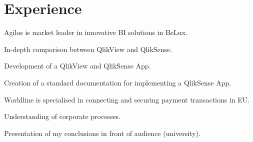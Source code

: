 \documentclass[letterpaper]{my-resume} %
\begin{document}
\begin{minipage}[t]{0.66\textwidth} %


\section{Experience}

Agilos is market leader in innovative BI solutions in BeLux.
\vspace{\topsep} %
\begin{tightitemize}
\item In-depth comparison between QlikView and QlikSense.
\item Development of a QlikView and QlikSense App.
\item Creation of a standard documentation for implementing a QlikSense App.
\end{tightitemize}

\sectionspace %



Worldline is specialised in connecting and securing payment transactions in EU.
\begin{tightitemize}
\item Understanding of corporate processes.
\item Presentation of my conclusions in front of audience (university).
\end{tightitemize}


\end{minipage}
\end{document}
